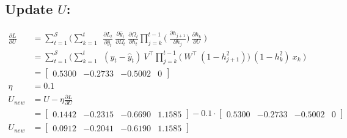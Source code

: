 \documentclass{article}
\begin{document}
\subsection{Update $U$:}
\begin{align*}
\frac{\partial L}{ \partial{U}} &= \sum_{t=1}^{\mathcal{S}} 
	\bigg(	
	 \sum_{k=1}^{t} ~
	~\frac{\partial L_t}{\partial \hat{y}_t}
        ~\frac{\partial \hat{y}_t}{\partial \Omega_t}
	~\frac{\partial \Omega_t}{\partial h_t}
        \prod_{j=k}^{t-1} \bigg(
	~\frac{\partial h_{j+1}}{\partial h_{j}}
        \bigg)
	~\frac{\partial h_k}{\partial U}~
	\bigg) \\
  &= \sum_{t=1}^{\mathcal{S}} 
	\bigg(	
	 \sum_{k=1}^{t} ~
	~(y_t - \hat{y}_t)
	~V^\top
        \prod_{j=k}^{t-1} \bigg(
	~W^\top ~ (1 - h_{j+1}^2)
        \bigg)
	~(1-h_k^2)~ x_{k}~
	\bigg) \\
    &= \begin{bmatrix}
0.5300 & -0.2733 & -0.5002 & 0
\end{bmatrix}\\
\eta &= 0.1\\
U_{new} &= U - \eta \frac{\partial L}{\partial U}\\
&=\begin{bmatrix}
    0.1442 & -0.2315 & -0.6690 & 1.1585
\end{bmatrix} - 0.1 \cdot \begin{bmatrix}
0.5300 & -0.2733 & -0.5002 & 0
\end{bmatrix}\\
U_{new} &= \begin{bmatrix}
0.0912 & -0.2041 & -0.6190 & 1.1585
\end{bmatrix}
\end{align*}
\end{document}
